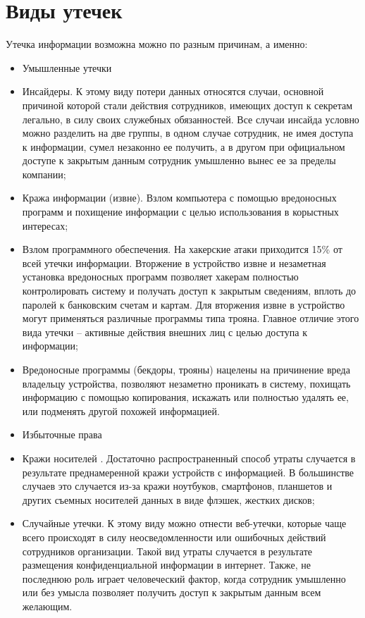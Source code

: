 \section{Виды утечек}

Утечка информации возможна можно по разным причинам, а именно:

\begin{itemize}
	\item
		Умышленные утечки 
	\item
		Инсайдеры. К этому виду потери данных относятся случаи, основной причиной которой стали действия сотрудников, имеющих доступ к секретам легально, в силу своих служебных обязанностей. Все случаи инсайда условно можно разделить на две группы, в одном случае сотрудник, не имея доступа к информации, сумел незаконно ее получить, а в другом при официальном доступе к закрытым данным сотрудник умышленно вынес ее за пределы компании; 
	\item
		Кража информации (извне). Взлом компьютера с помощью вредоносных программ и похищение информации с целью использования в корыстных интересах;  
	\item
		Взлом программного обеспечения. На хакерские атаки приходится 15\% от всей утечки информации. Вторжение в устройство извне и незаметная установка вредоносных программ позволяет хакерам полностью контролировать систему и получать доступ к закрытым сведениям, вплоть до паролей к банковским счетам и картам. Для вторжения извне в устройство могут применяться различные программы типа трояна. Главное отличие этого вида утечки – активные действия внешних лиц с целью доступа к информации; 
	\item 
	    Вредоносные программы (бекдоры, трояны) нацелены на причинение вреда владельцу устройства, позволяют незаметно проникать в систему, похищать информацию с помощью копирования, искажать или полностью удалять ее, или подменять другой похожей информацией. 
	\item 
	    Избыточные права
	\item 
	    Кражи носителей    . Достаточно распространенный способ утраты случается в результате преднамеренной кражи устройств с информацией. В большинстве случаев это случается из-за кражи ноутбуков, смартфонов, планшетов и других съемных носителей данных в виде флэшек, жестких дисков;
	\item 
	    Случайные утечки. К этому виду можно отнести веб-утечки, которые чаще всего происходят в силу неосведомленности или ошибочных действий сотрудников организации. Такой вид утраты случается в результате размещения конфиденциальной информации в интернет. Также, не последнюю роль играет человеческий фактор, когда сотрудник умышленно или без умысла позволяет получить доступ к закрытым данным всем желающим.
\end{itemize}

       



  










